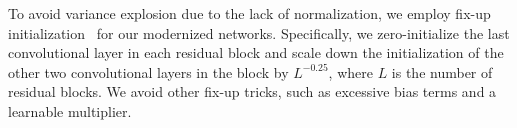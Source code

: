 To avoid variance explosion due to the lack of normalization, we employ fix-up initialization~\cite{fixup} for our modernized networks. Specifically, we zero-initialize the last convolutional layer in each residual block and scale down the initialization of the other two convolutional layers in the block by $L^{-0.25}$, where $L$ is the number of residual blocks. We avoid other fix-up tricks, such as excessive bias terms and a learnable multiplier.





\vspace{-1ex}
